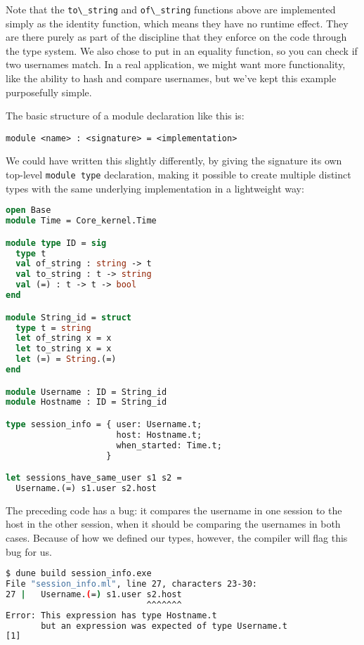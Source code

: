 Note that the \passthrough{\lstinline!to\_string!} and
\passthrough{\lstinline!of\_string!} functions above are implemented
simply as the identity function, which means they have no runtime
effect. They are there purely as part of the discipline that they
enforce on the code through the type system. We also chose to put in an
equality function, so you can check if two usernames match. In a real
application, we might want more functionality, like the ability to hash
and compare usernames, but we've kept this example purposefully simple.

The basic structure of a module declaration like this is:

\begin{lstlisting}
module <name> : <signature> = <implementation>
\end{lstlisting}

We could have written this slightly differently, by giving the signature
its own top-level \passthrough{\lstinline!module type!} declaration,
making it possible to create multiple distinct types with the same
underlying implementation in a lightweight way:

\begin{lstlisting}[language=Caml]
open Base
module Time = Core_kernel.Time

module type ID = sig
  type t
  val of_string : string -> t
  val to_string : t -> string
  val (=) : t -> t -> bool
end

module String_id = struct
  type t = string
  let of_string x = x
  let to_string x = x
  let (=) = String.(=)
end

module Username : ID = String_id
module Hostname : ID = String_id

type session_info = { user: Username.t;
                      host: Hostname.t;
                      when_started: Time.t;
                    }

let sessions_have_same_user s1 s2 =
  Username.(=) s1.user s2.host
\end{lstlisting}

The preceding code has a bug: it compares the username in one session to
the host in the other session, when it should be comparing the usernames
in both cases. Because of how we defined our types, however, the
compiler will flag this bug for us.

\begin{lstlisting}[language=bash]
$ dune build session_info.exe
File "session_info.ml", line 27, characters 23-30:
27 |   Username.(=) s1.user s2.host
                            ^^^^^^^
Error: This expression has type Hostname.t
       but an expression was expected of type Username.t
[1]
\end{lstlisting}

